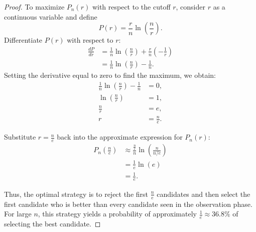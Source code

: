 \documentclass[letterpaper, 11pt]{article}
\newcommand{\1}{\mathds{1}}	%
\theoremstyle{definition}
\begin{document}
\begin{proof}
To maximize $P_n(r)$ with respect to the cutoff $r$, consider $r$ as a continuous variable and define
\[
P(r) = \frac{r}{n}\ln\!\left(\frac{n}{r}\right).
\]
Differentiate $P(r)$ with respect to $r$:
\begin{align*}
\frac{dP}{dr} &= \frac{1}{n}\ln\!\left(\frac{n}{r}\right) + \frac{r}{n} \left(-\frac{1}{r}\right)\\[1ex]
&=\frac{1}{n}\ln\!\left(\frac{n}{r}\right) - \frac{1}{n}.
\end{align*}
Setting the derivative equal to zero to find the maximum, we obtain:
\begin{align*}
\frac{1}{n}\ln\!\left(\frac{n}{r}\right) - \frac{1}{n} &= 0,\\[1ex]
\ln\!\left(\frac{n}{r}\right) &= 1,\\[1ex]
\frac{n}{r} &= e,\\[1ex]
r &= \frac{n}{e}.
\end{align*}

Substitute $r=\frac{n}{e}$ back into the approximate expression for $P_n(r)$:
\begin{align*}
P_n\left(\frac{n}{e}\right) &\approx \frac{\frac{n}{e}}{n}\ln\!\left(\frac{n}{n/e}\right)\\[1ex]
&=\frac{1}{e}\ln(e)\\[1ex]
&=\frac{1}{e}.
\end{align*}

Thus, the optimal strategy is to reject the first $\frac{n}{e}$ candidates and then select the first candidate who is better than every candidate seen in the observation phase. For large $n$, this strategy yields a probability of approximately $\frac{1}{e} \approx 36.8\%$ of selecting the best candidate.

\end{proof}
    
\end{document}
